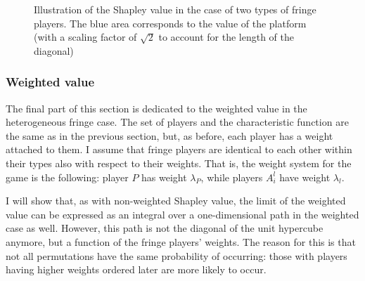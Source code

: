 \documentclass[a4paper]{article}
\begin{document}
\begin{figure}
    \centering
    \caption{Illustration of the Shapley value in the case of two types of fringe players. The blue area corresponds to the value of the platform (with a scaling factor of $\sqrt{2}$ to account for the length of the diagonal)}
    \label{fig:many_sided_shapley}
\end{figure}


\subsubsection{Weighted value}

The final part of this section is dedicated to the weighted value in the heterogeneous fringe case.
The set of players and the characteristic function are the same as in the previous section, but, as before, each player has a weight attached to them.
I assume that fringe players are identical to each other within their types also with respect to their weights.
That is, the weight system for the game is the following: player $P$ has weight $\lambda_P$, while players $A^l_i$ have weight $\lambda_l$.

I will show that, as with non-weighted Shapley value, the limit of the weighted value can be expressed as an integral over a one-dimensional path in the weighted case as well.
However, this path is not the diagonal of the unit hypercube anymore, but a function of the fringe players' weights.
The reason for this is that not all permutations have the same probability of occurring: those with players having higher weights ordered later are more likely to occur.
\end{document}
